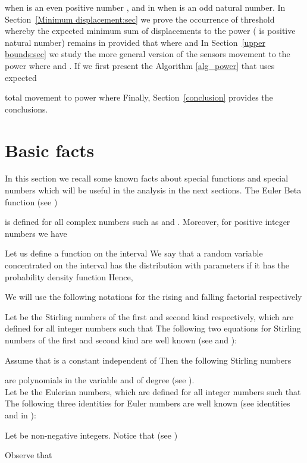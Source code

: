 \documentclass[final,5p,times,twocolumn]{elsarticle_mod}
\begin{document}
when  is an even positive number ,
and in  when  is an odd natural number.
In
Section~\ref{Minimum displacement:sec}
we prove the occurrence of threshold
whereby the expected minimum sum of
displacements to the power  ( is positive natural number) remains in 
provided that  where  and 
In Section~\ref{upper bounds:sec} we
study the more general version of the sensors movement to the power  where  and
. If  we first present the Algorithm \ref{alg_power} that uses expected 

total movement to power  
where 
Finally,
Section~\ref{conclusion}
provides the conclusions. 
\section{Basic facts}
\label{sec:Introduction}
In this section we recall some known facts about special functions and special numbers which will be useful in the analysis
in the next sections. The Euler Beta function (see \cite{NIST})

is defined for all complex numbers  
such as  and . 
Moreover, for positive integer numbers  we have

Let us define a function  on the interval 
We say that a random variable  concentrated on the interval
 has the  distribution with parameters
 if it has the probability density function
 Hence,

We will  use the following notations
for the rising and falling factorial respectively \cite{concrete_1994}


Let    be the Stirling numbers of the first and second kind respectively, which are
defined for all integer numbers such that  
The following two equations for Stirling numbers of the first and second kind are well known  (see \cite[identity 6.10]{concrete_1994} and \cite[identity 6.13]{concrete_1994}):


Assume that  is a constant independent of  Then the following Stirling numbers

are polynomials in the variable  and of degree  (see \cite{concrete_1994}).\\
Let    be the Eulerian numbers, which are
defined for all integer numbers such that  
The following three identities for Euler numbers are well known (see identities   and  in \cite{concrete_1994}):



Let  be non-negative integers. Notice that (see \cite[identity 5.41]{concrete_1994})

Observe that
\end{document}

